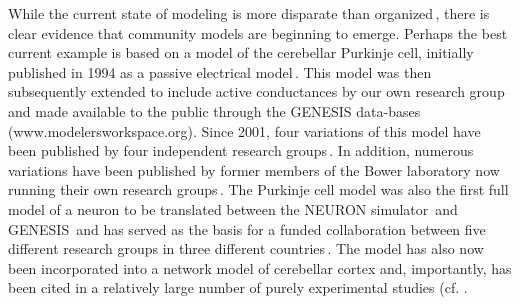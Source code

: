 \documentclass[12pt]{article}
\begin{document}
While the current state of modeling is more disparate than organized\,\cite{Nordlie:2009oq}, there is clear evidence that community models are beginning to emerge.  Perhaps the best current example is based on a model of the cerebellar Purkinje cell, initially published in 1994 as a passive electrical model\,\cite{Rapp-P:1994qf}. This model was then subsequently extended to include active conductances by our own research group\,\cite{De-Schutter-E:1994vn, E:1994hc, schutter94:_simul_purkin} and made available to the public through the GENESIS data-bases (www.modelersworkspace.org).  Since 2001, four variations of this model have been published by four independent research groups\,\cite{chono03:_purkin, coop01, miyasho01:_low_ca2_purkin, steuber07:_cereb_ltd_purkin}.  In addition, numerous variations have been published by former members of the Bower laboratory now running their own research groups\,\cite{De-Schutter:2009kl, Kreiner:2004tg, Solinas:2006hc}.  The Purkinje cell model was also the first full model of a neuron to be translated between the NEURON simulator\,\cite{hines97:_neuron_simul_envir} and GENESIS\,\cite{steuber07:_cereb_ltd_purkin} and has served as the basis for a funded collaboration between five different research groups in three different countries\,\cite{steuber07:_cereb_ltd_purkin}.  The model has also now been incorporated into a network model of cerebellar cortex and, importantly, has been cited in a relatively large number of purely experimental studies (cf. \cite{Cavelier-P:2002ij, Ogasawara:2007bs, Pouille:2000fv, Widmer:2003dz, Williams:2002fu, Willoughby:2002kl}. 
\end{document}
